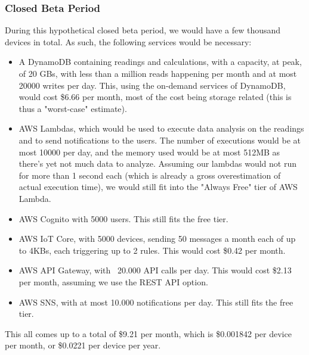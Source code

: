 \subsubsection{Closed Beta Period}
During this hypothetical closed beta period, we would have a few thousand devices in total.
As such, the following services would be necessary:
\begin{itemize}
    \item A DynamoDB containing readings and calculations, with a capacity, at peak, of
          20 GBs, with less than a million reads happening per month and at most
          20000 writes per day. This, using the on-demand services of DynamoDB, would cost
          \$6.66 per month, most of the cost being storage related (this is thus
          a "worst-case" estimate).
    \item AWS Lambdas, which would be used to execute data analysis on the readings
          and to send notifications to the users. The number of executions would
          be at most 10000 per day, and the memory used would be at most 512MB
          as there's yet not much data to analyze. Assuming our lambdas would not
          run for more than 1 second each (which is already a gross overestimation
          of actual execution time), we would still fit into the "Always Free" tier
          of AWS Lambda.
    \item AWS Cognito with 5000 users. This still fits the free tier.
    \item AWS IoT Core, with 5000 devices, sending 50 messages a month each of 
          up to 4KBs, each triggering up to 2 rules. This would cost \$0.42 per
          month.
    \item AWS API Gateway, with ~20.000 API calls per day. This would cost \$2.13
          per month, assuming we use the REST API option.
    \item AWS SNS, with at most 10.000 notifications per day. This still fits the
          free tier.
\end{itemize}

This all comes up to a total of \$9.21 per month, which is \$0.001842 per device
per month, or \$0.0221 per device per year.

